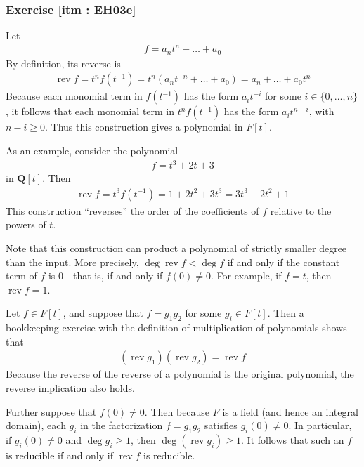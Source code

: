 \documentclass[oneside, english, 11pt]{article}
\newcommand{\Q}{\rationals}
\newcommand{\rationals}{\mathbf{Q}}
\DeclareMathOperator{\reverse}{rev}
\begin{document}
{\subsubsection*{Exercise \ref{itm : EH03e}}

Let
\begin{align*}
f
=
a_{n} t^{n} + \ldots + a_{0}
\end{align*}
By definition, its reverse is
\begin{align*}
\reverse f
=
t^{n} f(t^{-1})
=
t^{n} (a_{n} t^{-n} + \ldots + a_{0})
=
a_{n} + \ldots + a_{0} t^{n}
\end{align*}
Because each monomial term in $f(t^{-1})$ has the form $a_{i} t^{-i}$ for some $i \in \{0, \ldots, n\}$, it follows that each monomial term in $t^{n} f(t^{-1})$ has the form $a_{i} t^{n - i}$, with $n - i \geq 0$. Thus this construction gives a polynomial in $F[t]$.

As an example, consider the polynomial
\begin{align*}
f
=
t^{3} + 2 t + 3
\end{align*}
in $\Q[t]$. Then
\begin{align*}
\reverse f
=
t^{3} f(t^{-1})
=
1 + 2 t^{2} + 3 t^{3}
=
3 t^{3} + 2 t^{2} + 1
\end{align*}
This construction ``reverses'' the order of the coefficients of $f$ relative to the powers of $t$.

Note that this construction can product a polynomial of strictly smaller degree than the input. More precisely, $\deg \reverse f < \deg f$ if and only if the constant term of $f$ is $0$---that is, if and only if $f(0) \neq 0$. For example, if $f = t$, then $\reverse f = 1$.

Let $f \in F[t]$, and suppose that $f = g_{1} g_{2}$ for some $g_{i} \in F[t]$. Then a bookkeeping exercise with the definition of multiplication of polynomials shows that
\begin{align*}
(\reverse g_{1}) (\reverse g_{2})
=
\reverse f
\end{align*}
Because the reverse of the reverse of a polynomial is the original polynomial, the reverse implication also holds.

Further suppose that $f(0) \neq 0$. Then because $F$ is a field (and hence an integral domain), each $g_{i}$ in the factorization $f = g_{1} g_{2}$ satisfies $g_{i}(0) \neq 0$. In particular, if $g_{i}(0) \neq 0$ and $\deg g_{i} \geq 1$, then $\deg(\reverse g_{i}) \geq 1$. It follows that such an $f$ is reducible if and only if $\reverse f$ is reducible.}%
\end{document}
